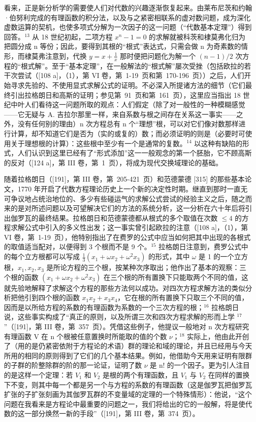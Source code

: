 看来，正是新分析学的需要使人们对代数的兴趣逐渐恢复起来。由莱布尼茨和约翰·伯努利完成的有理函数的积分法，以及与之紧密相联系的虚对数问题，成为深化虚数运算的契机，也使多项式分解为一次因子的这一问题（“代数基本定理”）得到回答。\(^{13}\) 从 18 世纪初起，二项方程 \(x^{n}-1=0\) 的求解就被科茨和棣莫弗化归为把圆分成 n 等份；因此，要得到其根的“根式”表达式，只需会做 n 为奇素数的情形，而棣莫弗注意到，代换 \(y = x + \frac{1}{x}\) 那时便把问题化为解一个 \((n - 1)/2\) 次方程的“根式解”。至于“基本定理”，在一般解法的“根式解”屡次受挫（包括欧拉的若干次尝试（{[}108 a{]}，（1），第 VI 卷，第~1-19~页和第~170-196~页））之后，人们开始寻求先验的、不使用显式求解公式的证明。不必深入所提诸方法的细节（它们最终引出拉格朗日和高斯的证明；参见第~91~页和第~161~页），这里应当指出 18 世纪中叶人们看待这一问题所取的观点：人们假定（除了对一般性的一种模糊感觉——它无疑与 A. 吉拉尔那里一样，来自系数与根之间存在关系这一事实——之外，没有任何别的理由）n 次方程总有 n 个“理想”根，可以对它们像对数那样进行计算，却不知道它们是否为（实的或复的）数；而必须证明的则是（必要时可使用关于理想根的计算）：这些根中至少有一个是通常的复数。\(^{14}\) 以这种有缺陷的形式，人们认识到这里已经有了“形式添加”这一一般观念的第一个胚胎，它不顾高斯的反对（{[}124 a{]}，第 III 卷，第~1~页），将成为现代交换域理论的基础。

随着拉格朗日（{[}191{]}，第 III 卷，第~205-421~页）和范德蒙德 {[}315{]} 的那些基本论文，1770 年开启了代数方程理论历史上一个新的决定性时期。继直到那时一直无可争议地占统治地位的、多少有些碰运气的求解公式尝试的经验主义之后，随之而来的是对所述问题以及可望解决它们的方法的系统分析，这一分析在六十年后将引出伽罗瓦的最终结果。拉格朗日和范德蒙德都从根式的多个取值在次数 \(\leq 4\) 的方程求解公式中引入的多义性出发；这一事实曾引起欧拉的注意（{[}108 a{]}，（1），第 VI 卷，第~1-19~页），他特别指出了在费罗的公式中应当如何把其中出现的各根式的取值适当配对，以便得到 3 个根而不是 9 个。\(^{15}\) 拉格朗日注意到，费罗公式中的每个立方根都可以写成 \(\frac{1}{3}(x_1 + \omega x_2 + \omega^2 x_3)\) 的形式，其中 \(\omega\) 是 1 的一个立方根，\(x_1, x_2, x_3\) 是所论方程的三个根，按某种次序取出；他作出了基本的观察：三个根的函数 \((x_1 + \omega x_2 + \omega^2 x_3)\) 在三个根的所有置换下只能取两个不同的值，这就先验地解释了求解这个方程的那些方法何以成功。对四次方程求解方法的类似分析把他引到四个根的函数 \(x_{1}x_{2} + x_{3}x_{4}\)，它在根的所有置换下只取三个不同的值，因而是以所给方程的系数的有理函数为系数的一个三次方程的根；\(^{16}\) 拉格朗日说，这些事实构成了“真正的原则，以及所谓三次和四次方程求解的形而上学 \(^{17}\)”（{[}191{]}，第 III 卷，第~357~页）。凭借这些例子，他提议一般地对 n 次方程研究有理函数 V 在 n 个根被任意置换时所能取的值的个数 \(\nu\)；\(^{18}\) 实际上，他由此开创了（用的是仍紧密依附于方程论的术语）群的理论和域的理论，并且已经用与今天所用的相同的原则得到了它们的几个基本结果。例如，他借助今天用来证明有限群的子群的阶整除群的阶的那一论证，证明了数 \(\nu\) 是 n! 的一个因子。更为引人注目的是这样一个定理：若 \(V_{1}\) 和 \(V_{2}\) 是根的两个有理函数，且 \(V_{1}\) 与 \(V_{2}\) 在同样的置换下不变，则其中每一个都是另一个与方程的系数的有理函数（这是伽罗瓦把伽罗瓦扩张的子扩张刻画为其伽罗瓦群的不变量域的定理的一个特殊情形）：他说，“这个问题在我看来是方程论中最重要的问题之一，我们将给出的它的一般解，将是使代数的这一部分焕然一新的手段”（{[}191{]}，第 III 卷，第~374~页）。

